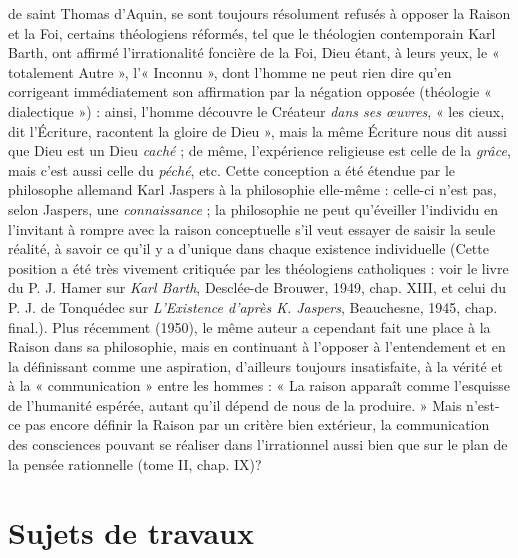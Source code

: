 de saint Thomas d'Aquin, se sont toujours résolument refusés à
opposer la Raison et la Foi, certains théologiens réformés, tel que le
théologien contemporain Karl Barth, ont affirmé l’irrationalité
foncière de la Foi, Dieu étant, à leurs yeux, le « totalement Autre »,
l'« Inconnu », dont l’homme ne peut rien dire qu’en corrigeant immédiatement son affirmation par la négation opposée (théologie « dialectique ») : ainsi, l’homme découvre le Créateur {\it dans ses œuvres}, « les
cieux, dit l’Écriture, racontent la gloire de Dieu », mais la même
Écriture nous dit aussi que Dieu est un Dieu {\it caché} ; de même, l’expérience religieuse est celle de la {\it grâce}, mais c’est aussi celle du {\it péché}, etc.
Cette conception a été étendue par le philosophe allemand Karl
Jaspers à la philosophie elle-même : celle-ci n’est pas, selon Jaspers,
une {\it connaissance} ; la philosophie ne peut qu’éveiller l'individu en
l'invitant à rompre avec la raison conceptuelle s’il veut essayer de
saisir la seule réalité, à savoir ce qu'il y a d’unique dans chaque
existence individuelle {\scriptsize (Cette position a été très vivement critiquée par les théologiens catholiques : voir
le livre du P. J. Hamer sur {\it Karl Barth}, Desclée-de Brouwer, 1949, chap. XIII, et
celui du P. J. de Tonquédec  sur {\it L'Existence d'après K. Jaspers}, Beauchesne, 1945, chap. final.)}. Plus récemment (1950), le même auteur a
cependant fait une place à la Raison dans sa philosophie, mais en
continuant à l’opposer à l’entendement et en la définissant comme
une aspiration, d’ailleurs toujours insatisfaite, à la vérité et à la
« communication » entre les hommes : « La raison apparaît comme
l’esquisse de l'humanité espérée, autant qu’il dépend de nous de la
produire. » Mais n’est-ce pas encore définir la Raison par un critère
bien extérieur, la communication des consciences pouvant se réaliser
dans l’irrationnel aussi bien que sur le plan de la pensée rationnelle
(tome II, chap. IX)?

\section{Sujets de travaux}

